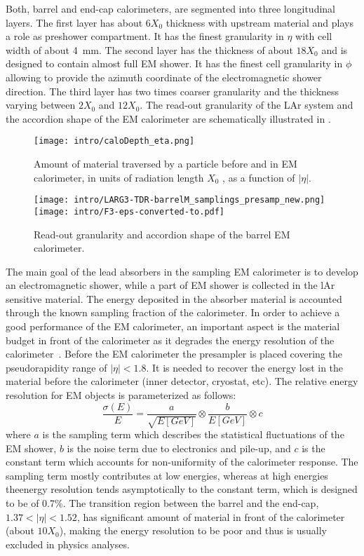 Both, barrel and end-cap calorimeters, are segmented into three longitudinal layers. The first layer has about $6 X_0$ thickness with upstream material and plays a role as preshower compartment. It has the finest granularity in $\eta$ with cell width of about 4~mm. The second layer has the thickness of about $18 X_0$ and is designed to contain almost full EM shower. It has the finest cell granularity in $\phi$ allowing to provide the azimuth coordinate of the electromagnetic shower direction. The third layer has two times coarser granularity and the thickness varying between $2 X_0$ and $12 X_0$. The read-out granularity of the LAr system and the accordion shape of the EM calorimeter are schematically illustrated in .

\begin{figure}[h!]
\centering
 \texttt{[image: intro/caloDepth\_eta.png]}
 \caption{Amount of material traversed by a particle before and in EM calorimeter, in units of radiation length $X_0$ , as a function of $|\eta|$.}
\label{fig:Calo}
\end{figure}

\begin{figure}[h!]
\centering
 \texttt{[image: intro/LARG3-TDR-barrelM\_samplings\_presamp\_new.png]}
 \texttt{[image: intro/F3-eps-converted-to.pdf]}
 \caption{Read-out granularity and accordion shape of the barrel EM calorimeter.}
\label{fig:EMgran}
\end{figure}

The main goal of the lead absorbers in the sampling EM calorimeter is to develop an electromagnetic shower, while a part of EM shower is collected in the lAr sensitive material. The energy deposited in the absorber material is accounted through the known sampling fraction of the calorimeter. In order to achieve a good performance of the EM calorimeter, an important aspect is the material budget in front of the calorimeter as it degrades the energy resolution of the calorimeter~\cite{electron_tight}.
Before the EM calorimeter the presampler is placed covering the pseudorapidity range of $|\eta|<1.8$. It is needed to recover the energy lost in the material before the calorimeter (inner detector, cryostat, etc).
The relative energy resolution for EM objects is parameterized as follows:
\begin{equation}
\frac{\sigma(E)}{E}=\frac{a}{\sqrt{E[GeV]}}\otimes\frac{b}{E[GeV]}\otimes c
\end{equation}
where $a$ is the sampling term which describes the statistical fluctuations of the EM shower, $b$ is the noise term due to electronics and pile-up, and $c$ is the constant term which accounts for non-uniformity of the calorimeter response. The sampling term mostly contributes at low energies, whereas at high energies theenergy resolution tends asymptotically to the constant term, which is designed  to be of 0.7\%.
The transition region between the barrel and the end-cap, $1.37<|\eta|<1.52$, has significant amount of material in front of the calorimeter (about $ 10 X_0$), making the energy resolution to be poor and thus is usually excluded in physics analyses.

